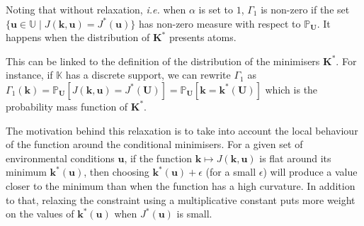 \documentclass[preprint, 1p]{elsarticle}
\newcommand{\Prob}{\mathbb{P}}
\newcommand{\Kspace}{\mathbb{K}}
\newcommand{\Uspace}{\mathbb{U}}
\begin{document}
Noting that without relaxation, \textit{i.e.} when $\alpha$ is set to $1$, $\Gamma_1$ is non-zero if the set $\{\mathbf{u}\in\Uspace \mid J(\mathbf{k},\mathbf{u}) = J^*(\mathbf{u})\}$ has non-zero measure with respect to $\Prob_{\mathbf{U}}$. It happens when the distribution of $\mathbf{K}^*$ presents atoms.

This can be linked to the definition of the distribution of the minimisers $\mathbf{K}^*$. For instance, if $\Kspace$ has a discrete support, we can rewrite $\Gamma_1$ as $\Gamma_1(\mathbf{k})=\Prob_{\mathbf{U}}\left[J(\mathbf{k},\mathbf{u}) = J^*(\mathbf{U})\right] = \Prob_{\mathbf{U}}\left[\mathbf{k} = \mathbf{k}^*(\mathbf{U})\right]$ which is the probability mass function of $\mathbf{K}^*$.

The motivation behind this relaxation is to take into account the local behaviour of the function around the conditional minimisers.
For a given set of environmental conditions $\mathbf{u}$, if the function $\mathbf{k} \mapsto J(\mathbf{k},\mathbf{u})$ is flat around its minimum $\mathbf{k}^*(\mathbf{u})$, then choosing  $\mathbf{k}^*(\mathbf{u}) + \epsilon$ (for a small $\epsilon$) will produce a value closer to the minimum than when the function has a high curvature.
In addition to that, relaxing the constraint using a multiplicative constant puts more weight on the values of $\mathbf{k}^*(\mathbf{u})$ when $J^*(\mathbf{u})$ is small.
\end{document}
